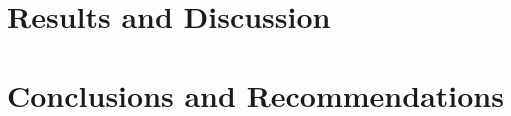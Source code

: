 \documentclass[12pt, twoside]{book}
\begin{document}
\chapter{Results and Discussion}
\label{chap:results}



%


\chapter{Conclusions and Recommendations}
\label{chap:conclusions}





 
 

\appendix  
\clearpage %
\addappheadtotoc 
\appendixpage 


\end{document}
